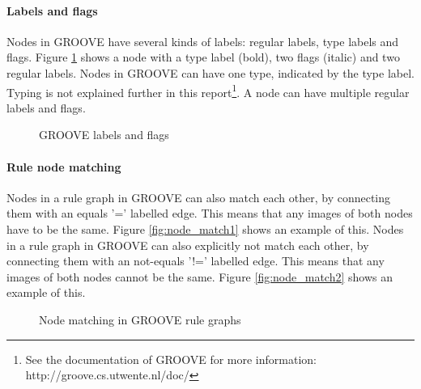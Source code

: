\paragraph*{Labels and flags}
Nodes in GROOVE have several kinds of labels: regular labels, type labels and flags. Figure \ref{fig:flags} shows a node with a type label (bold), two flags (italic) and two regular labels. Nodes in GROOVE can have one type, indicated by the type label. Typing is not explained further in this report\footnote{See the documentation of GROOVE for more information: http://groove.cs.utwente.nl/doc/}. A node can have multiple regular labels and flags. 

\begin{figure}[h]
  \begin{center}
    
  \end{center}
  \caption{GROOVE labels and flags}
  \label{fig:flags}
\end{figure}

\paragraph*{Rule node matching}
Nodes in a rule graph in GROOVE can also match each other, by connecting them with an equals '=' labelled edge. This means that any images of both nodes have to be the same. Figure \ref{fig:node_match1} shows an example of this. Nodes in a rule graph in GROOVE can also explicitly not match each other, by connecting them with an not-equals '!=' labelled edge. This means that any images of both nodes cannot be the same. Figure \ref{fig:node_match2} shows an example of this.

\begin{figure}[h]
  \begin{center}
    \hspace{20px}
  \end{center}
  \caption{Node matching in GROOVE rule graphs}
  \label{fig:node_match}
\end{figure}

